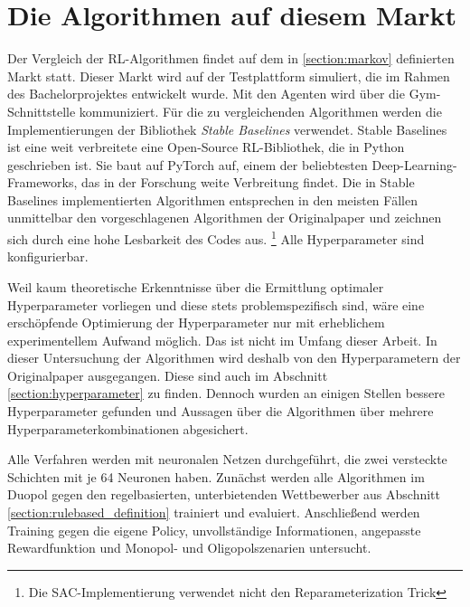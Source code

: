 \section{Die Algorithmen auf diesem Markt}
Der Vergleich der RL-Algorithmen findet auf dem in \ref{section:markov} definierten Markt statt.
Dieser Markt wird auf der Testplattform simuliert, die im Rahmen des Bachelorprojektes entwickelt wurde.
Mit den Agenten wird über die Gym-Schnittstelle kommuniziert. \cite{brockman2016openai}
Für die zu vergleichenden Algorithmen werden die Implementierungen der Bibliothek \textit{Stable Baselines} verwendet. \cite{stable-baselines}
Stable Baselines ist eine weit verbreitete eine Open-Source RL-Bibliothek, die in Python geschrieben ist.
Sie baut auf PyTorch auf, einem der beliebtesten Deep-Learning-Frameworks, das in der Forschung weite Verbreitung findet. \cite{NEURIPS2019_9015}
Die in Stable Baselines implementierten Algorithmen entsprechen in den meisten Fällen unmittelbar den vorgeschlagenen Algorithmen der Originalpaper und zeichnen sich durch eine hohe Lesbarkeit des Codes aus. \footnote{Die SAC-Implementierung verwendet nicht den Reparameterization Trick}
Alle Hyperparameter sind konfigurierbar.

Weil kaum theoretische Erkenntnisse über die Ermittlung optimaler Hyperparameter vorliegen und diese stets problemspezifisch sind, wäre eine erschöpfende Optimierung der Hyperparameter nur mit erheblichem experimentellem Aufwand möglich.
Das ist nicht im Umfang dieser Arbeit.
In dieser Untersuchung der Algorithmen wird deshalb von den Hyperparametern der Originalpaper ausgegangen.
Diese sind auch im Abschnitt \ref{section:hyperparameter} zu finden.
Dennoch wurden an einigen Stellen bessere Hyperparameter gefunden und Aussagen über die Algorithmen über mehrere Hyperparameterkombinationen abgesichert.

Alle Verfahren werden mit neuronalen Netzen durchgeführt, die zwei versteckte Schichten mit je 64 Neuronen haben.
Zunächst werden alle Algorithmen im Duopol gegen den regelbasierten, unterbietenden Wettbewerber aus Abschnitt \ref{section:rulebased_definition} trainiert und evaluiert.
Anschließend werden Training gegen die eigene Policy, unvollständige Informationen, angepasste Rewardfunktion und Monopol- und Oligopolszenarien untersucht.

